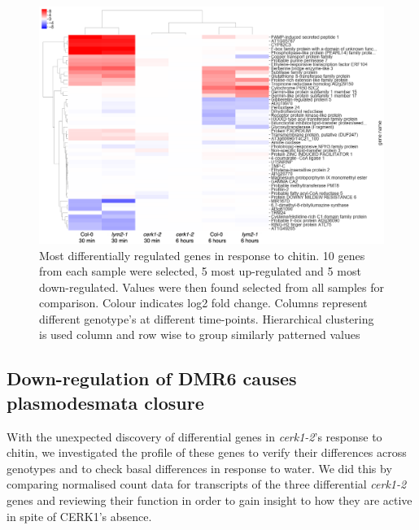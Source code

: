\documentclass[../main.tex]{subfiles}
\begin{document}

\begin{figure}[!ht]
  \centering
  \includegraphics[width=\columnwidth]{figures/allDEGs.png}
  \caption[Most differentially regulated  genes in response to
  chitin]{\label{fig:DEGS} Most differentially regulated  genes in response to
    chitin. 10 genes from each sample were selected, 5 most up-regulated and 5
    most down-regulated. Values were then found selected from all samples for
    comparison. Colour indicates log2 fold change. Columns represent different
    genotype's at different time-points. Hierarchical clustering is used column
    and row wise to group similarly patterned values}
\end{figure}


\subsection{Down-regulation of DMR6 causes plasmodesmata closure}

With the unexpected discovery of differential genes in \textit{cerk1-2}'s
response to chitin, we investigated the profile of these genes to verify their
differences across genotypes and to check basal differences in response to
water. We did this by comparing normalised count data for transcripts of the three
differential \textit{cerk1-2} genes and reviewing their function in order to
gain insight to how they are active in spite of CERK1's absence.
\end{document}
